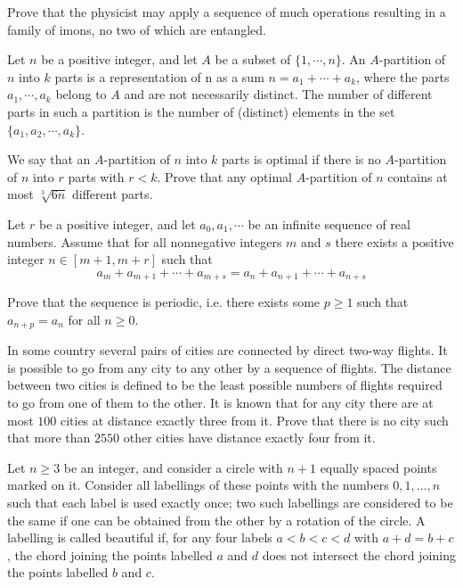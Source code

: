 Prove that the physicist may apply a sequence of much operations resulting in a family of imons, no two of which are entangled.

\item[\textbf{C4.}]
Let 
$n$
 be a positive integer, and let 
$A$
 be a subset of 
$\{ 1,\cdots ,n\}$.
 An 
$A$-partition of 
$n$
 into 
$k$
 parts is a representation of n as a sum 
$n = a_1 + \cdots + a_k$, 
 where the parts 
$a_1 , \cdots , a_k $
 belong to 
$A$
 and are not necessarily distinct. The number of different parts in such a partition is the number of (distinct) elements in the set 
$\{ a_1 , a_2 , \cdots , a_k \} $.


We say that an 
$A$-partition of 
$n$
 into 
$k$
 parts is optimal if there is no 
$A$-partition of 
$n$
 into 
$r$
 parts with 
$r<k$.
 Prove that any optimal 
$A$-partition of 
$n$
 contains at most 
$\sqrt[3]{6n}$
 different parts.

\item[\textbf{C5.}]
Let 
$r$
 be a positive integer, and let 
$a_0 , a_1 , \cdots $
 be an infinite sequence of real numbers. Assume that for all nonnegative integers 
$m$
 and 
$s$
 there exists a positive integer 
$n \in [m+1, m+r]$
 such that
\[ a_m + a_{m+1} +\cdots +a_{m+s} = a_n + a_{n+1} +\cdots +a_{n+s} \]


Prove that the sequence is periodic, i.e. there exists some 
$p \ge 1 $
 such that 
$a_{n+p} =a_n $
 for all 
$n \ge 0$.

\item[\textbf{C6.}]
In some country several pairs of cities are connected by direct two-way flights. It is possible to go from any city to any other by a sequence of flights. The distance between two cities is defined to be the least possible numbers of flights required to go from one of them to the other. It is known that for any city there are at most 
$100$
 cities at distance exactly three from it. Prove that  there is no city such that more than 
$2550$
 other cities have distance exactly four from it.

\item[\textbf{C7.}]
Let 
$n \ge 3$
 be an integer, and consider a circle with 
$n + 1$
 equally spaced points marked on it. Consider all labellings of these points with the numbers 
$0, 1, ... , n$
 such that each label is used exactly once; two such labellings are considered to be the same if one can be obtained from the other by a rotation of the circle. A labelling is called 
beautiful
 if, for any four labels 
$a < b < c < d$
 with 
$a + d = b + c$, 
 the chord joining the points labelled 
$a$
 and 
$d$
 does not intersect the chord joining the points labelled 
$b$
 and 
$c$.


